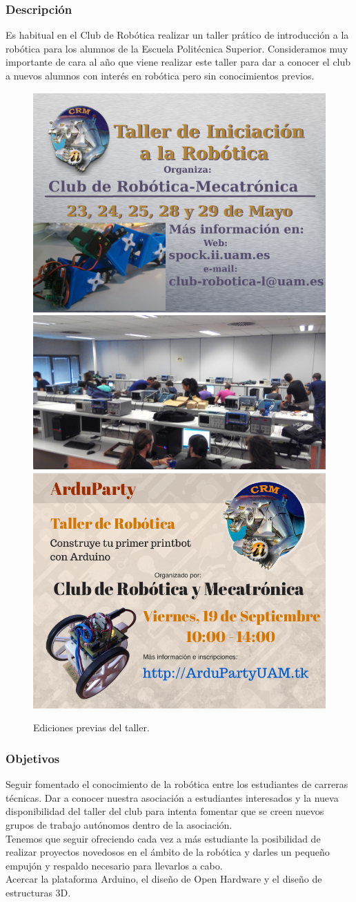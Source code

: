\documentclass[12pt,twoside]{report}
\begin{document}
\subsubsection{Descripción}
Es habitual en el Club de Robótica realizar un taller prático de introducción a la robótica para los alumnos de la Escuela Politécnica Superior. Consideramos muy importante de cara al año que viene realizar este taller para dar a conocer el club a nuevos alumnos con interés en robótica pero sin conocimientos previos.
\begin{figure}[hbtp]
\centerline{\includegraphics[width=0.33\linewidth]{fotos/2012_taller_arduino_pantallas.jpg} \includegraphics[width=0.4\linewidth]{fotos/fotoParticipantesArduparty.jpg} \includegraphics[width=0.33\linewidth]{fotos/2014_Cartel_ArduParty.png}}
\caption*{
Ediciones previas del taller.
}
\end{figure}

\subsubsection{Objetivos}
Seguir fomentado el conocimiento de la robótica entre los estudiantes de carreras técnicas. Dar a conocer nuestra asociación a estudiantes interesados y la nueva disponibilidad del taller del club para intenta fomentar que se creen nuevos grupos de trabajo autónomos dentro de la asociación.\\
Tenemos que seguir ofreciendo cada vez a más estudiante la posibilidad de realizar proyectos novedosos en el ámbito de la robótica y darles un pequeño empujón y respaldo necesario para llevarlos a cabo.\\
Acercar la plataforma Arduino, el diseño de Open Hardware y el diseño de estructuras 3D.
\end{document}
